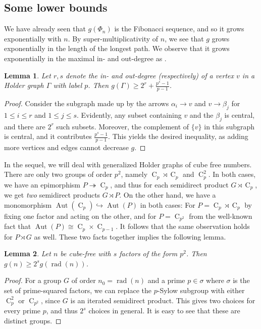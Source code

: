 \documentclass[draft]{article}
\newcommand{\aut}[1]{\operatorname{Aut}(#1)}
\newcommand{\cyc}[1]{\operatorname{C}_{#1}}
\theoremstyle{plain}
\newtheorem{lem}{Lemma}[section]
\theoremstyle{definition}
\begin{document}
\subsection{Some lower bounds}
We have already seen that $g(\Phi_n)$ is the Fibonacci sequence, and so it grows exponentially with $n$. By super-multiplicativity of $n$, we see that $g$ grows exponentially in the length of the longest path. We observe that it grows exponentially in the maximal in- and out-degree as .
\begin{lem}
	Let $r, s$ denote the in- and out-degree (respectively) of a vertex $v$ in a Holder graph $\Gamma$ with label $p$. Then $g(\Gamma) \ge 2^r + \frac{p^s - 1}{p - 1}$.
\end{lem}
\begin{proof}
	Consider the subgraph made up by the arrows $\alpha_i \rightarrow v$ and $v \rightarrow \beta_j$ for $1 \le i \le r$ and $1 \le j \le s$. Evidently, any subset containing $v$ and the $\beta_j$ is central, and there are $2^r$ such subsets. Moreover, the complement of $\{v\}$ in this subgraph is central, and it contributes $\frac{p^s - 1}{p - 1}$. This yields the desired inequality, as adding more vertices and edges cannot decrease \nolinebreak[4] $g$.
\end{proof}
In the sequel, we will deal with generalized Holder graphs of cube free numbers. There are only two groups of order $p^2$, namely $\cyc{p} \rtimes \cyc{p}$ and $\cyc{p}^2$. In both cases, we have an epimorphism $P \twoheadrightarrow \cyc{p}$, and thus for each semidirect product $G \rtimes \cyc{p}$, we get \textit{two} semidirect products $G \rtimes P$. On the other hand, we have a monomorphism $\aut{\cyc{p}} \hookrightarrow \aut{P}$ in both cases: For $P = \cyc{p} \rtimes \cyc{p}$ by fixing one factor and acting on the other, and for $P = \cyc{p^2}$ from the well-known fact that $\aut{P} \cong \cyc{p} \times \cyc{p - 1}$. It follows that the same observation holds for $P \rtimes G$ as well. These two facts together implies the following lemma.
\begin{lem}
	Let $n$ be cube-free with $s$ factors of the form $p^2$. Then $g(n) \ge 2^s g(\operatorname{rad}(n))$.
\end{lem}
\begin{proof}
	For a group $G$ of order $n_0 = \operatorname{rad}(n)$ and a prime $p \in \sigma$ where $\sigma$ is the set of prime-squared factors, we can replace the $p$-Sylow subgroup with either $\cyc{p}^2$ or $\cyc{p^2}$, since $G$ is an iterated semidirect product. This gives two choices for every prime $p$, and thus $2^s$ choices in general. It is easy to see that these are distinct groups.
\end{proof}
\end{document}

